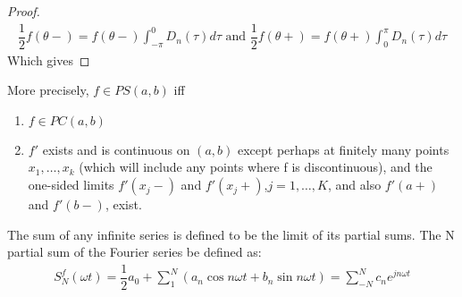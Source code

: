 \begin{proof}
	\begin{align*}
	\dfrac{1}{2} f(\theta-) = f(\theta-) \int_{-\pi}^0 D_n(\tau)d\tau \text{ and } \dfrac{1}{2}f(\theta+) = f(\theta+) \int_0^\pi D_n (\tau)d\tau
	\end{align*}
	Which gives
\end{proof}
More precisely, $f\in PS(a,b)$ iff 
\begin{enumerate}
	\item $f \in PC(a,b)$
	\item $f'$ exists and is continuous on $(a,b)$ except perhaps at finitely many points $x_1,\dots,x_k$ (which will include any points where f is discontinuous), and the one-sided limits $f'(x_j-)$ and $f'(x_j+)$,$j=1,\dots,K$, and also $f'(a+)$ and $f'(b-)$, exist.
\end{enumerate}
The sum of any infinite series is defined to be the limit of its partial sums.
The N partial sum of the Fourier series be defined as:
\begin{align}\label{eq:partialsumFourierSeries}
	S_N^f(\omega t) = \dfrac{1}{2} a_0 + \sum_1^N\left(a_n \cos n\omega t + b_n \sin n \omega t \right) = \sum_{-N}^N c_n e^{jn\omega t}
\end{align}

